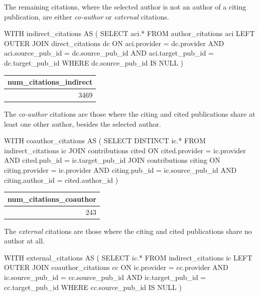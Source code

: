 The remaining citations, where the selected author is not an author of a citing publication, are either \emph{co-author} or \emph{external} citations.

\begin{SQLcode}
WITH indirect_citations AS (
    SELECT aci.*
    FROM author_citations aci
        LEFT OUTER JOIN direct_citations dc
            ON aci.provider = dc.provider
                AND aci.source_pub_id = dc.source_pub_id
                AND aci.target_pub_id = dc.target_pub_id
    WHERE dc.source_pub_id IS NULL
)
\end{SQLcode}

\begin{center}
    \begin{tabular}{|r|}
        \hline
        num\_citations\_indirect \\
        \hline\hline
        3469 \\
        \hline
    \end{tabular}
\end{center}

The \emph{co-author} citations are those where the citing and cited publications share at least one other author, besides the selected author.

\begin{SQLcode}
WITH coauthor_citations AS (
    SELECT DISTINCT ic.*
    FROM indirect_citations ic
        JOIN contributions cited
            ON cited.provider = ic.provider
                AND cited.pub_id = ic.target_pub_id
        JOIN contributions citing
            ON citing.provider = ic.provider
                AND citing.pub_id = ic.source_pub_id
                AND citing.author_id = cited.author_id
)
\end{SQLcode}

\begin{center}
    \begin{tabular}{|r|}
        \hline
        num\_citations\_coauthor \\
        \hline\hline
        243 \\
        \hline
    \end{tabular}
\end{center}

The \emph{external} citations are those where the citing and cited publications share no author at all.

\begin{SQLcode}
WITH external_citations AS (
    SELECT ic.*
    FROM indirect_citations ic
        LEFT OUTER JOIN coauthor_citations cc
            ON ic.provider = cc.provider
                AND ic.source_pub_id = cc.source_pub_id
                AND ic.target_pub_id = cc.target_pub_id
    WHERE cc.source_pub_id IS NULL
)
\end{SQLcode}

